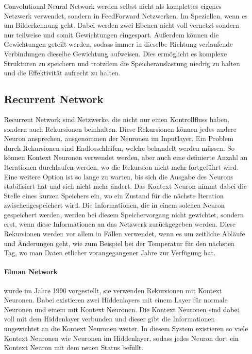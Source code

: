 Convolutional Neural Network werden selbst nicht als komplettes eigenes Netzwerk verwendet, sondern in FeedForward Netzwerken.
Im Speziellen, wenn es um Bilderkennung geht.
Dabei werden zwei Ebenen nicht voll vernetzt sondern nur teilweise und somit Gewichtungen eingespart.
Außerdem können die Gewichtungen geteilt werden, sodass immer in dieselbe Richtung verlaufende Verbindungen dieselbe Gewichtung aufweisen.
Dies ermöglicht es komplexe Strukturen zu speichern und trotzdem die Speicherauslastung niedrig zu halten und die Effektivität aufrecht zu halten.


\subsection{Recurrent Network}

Recurrent Network sind Netzwerke, die nicht nur einen Kontrollfluss haben, sondern auch Rekursionen beinhalten. 
Diese Rekursionen können jedes andere Neuron ansprechen, ausgenommen der Neuronen im Inputlayer.
Ein Problem durch Rekursionen sind Endlosschleifen, welche behandelt werden müssen.
So können Kontext Neuronen verwendet werden, aber auch eine definierte Anzahl an Iterationen durchlaufen werden, wo die Rekursion nicht mehr fortgeführt wird. 
Eine weitere Option ist so lange zu warten, bis sich die Ausgabe des Neurons stabilisiert hat und sich nicht mehr ändert.
Das Kontext Neuron nimmt dabei die Stelle eines kurzen Speichers ein, wo ein Zustand für die nächste Iteration zwischengespeichert wird.
Die Informationen, die in einem solchen Neuron gespeichert werden, werden bei diesem Speichervorgang nicht gewichtet, sondern erst, wenn diese Informationen an das Netzwerk zurückgegeben werden.
Diese Rekursionen werden vor allem in Fällen verwendet, wenn es um zeitliche Abläufe und Änderungen geht, wie zum Beispiel bei der Temperatur für den nächsten Tag, wo man Daten etlicher vorangegangener Jahre zur Verfügung hat.

\paragraph{Elman Network} wurde im Jahre 1990 vorgestellt, sie verwenden Rekursionen mit Kontext Neuronen. 
Dabei existieren zwei Hiddenlayers mit einem Layer für normale Neuronen und einem mit Kontext Neuronen. 
Die Kontext Neuronen sind dabei voll mit dem Hiddenlayer verbunden und dieser gibt die Informationen ungewichtet an die Kontext Neuronen weiter.
In diesem System existieren so viele Kontext Neuronen wie Neuronen im Hiddenlayer, sodass jedes Neuron dort ein Kontext Neuron mit dem neuen Status befüllt.

